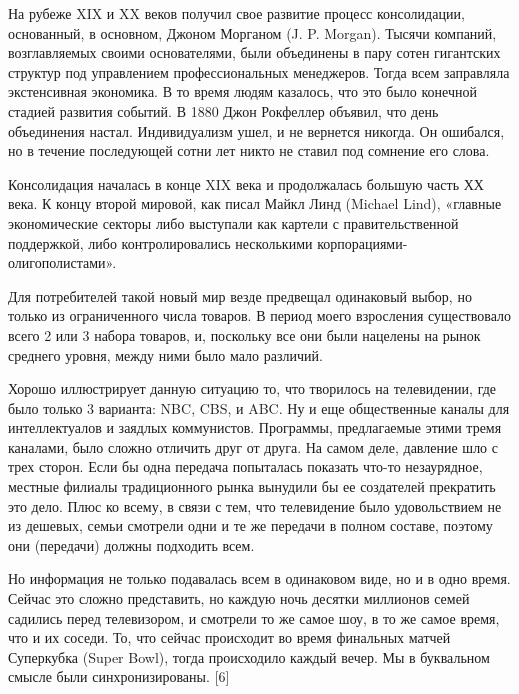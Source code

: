 \documentclass[ebook,12pt,oneside,openany]{memoir}
\begin{document}
На рубеже XIX и XX веков получил свое развитие процесс консолидации,
основанный, в основном, Джоном Морганом (J. P. Morgan). Тысячи
компаний, возглавляемых своими основателями, были объединены в пару
сотен гигантских структур под управлением профессиональных менеджеров.
Тогда всем заправляла экстенсивная экономика. В то время людям
казалось, что это было конечной стадией развития событий. В 1880 Джон
Рокфеллер объявил, что день объединения настал. Индивидуализм ушел, и
не вернется никогда. Он ошибался, но в течение последующей сотни лет
никто не ставил под сомнение его слова. \newline

Консолидация началась в конце XIX века и продолжалась большую часть ХХ
века. К концу второй мировой, как писал Майкл Линд (Michael Lind),
«главные экономические секторы либо выступали как картели с
правительственной поддержкой, либо контролировались несколькими
корпорациями-олигополистами». \newline

Для потребителей такой новый мир везде предвещал одинаковый выбор, но
только из ограниченного числа товаров. В период моего взросления
существовало всего 2 или 3 набора товаров, и, поскольку все они были
нацелены на рынок среднего уровня, между ними было мало различий. \newline

Хорошо иллюстрирует данную ситуацию то, что творилось на телевидении,
где было только 3 варианта: NBC, CBS, и ABC. Ну и еще общественные
каналы для интеллектуалов и заядлых коммунистов. Программы,
предлагаемые этими тремя каналами, было сложно отличить друг от друга.
На самом деле, давление шло с трех сторон. Если бы одна передача
попыталась показать что-то незаурядное, местные филиалы традиционного
рынка вынудили бы ее создателей прекратить это дело. Плюс ко всему, в
связи с тем, что телевидение было удовольствием не из дешевых, семьи
смотрели одни и те же передачи в полном составе, поэтому они
(передачи) должны подходить всем. \newline

Но информация не только подавалась всем в одинаковом виде, но и в одно
время. Сейчас это сложно представить, но каждую ночь десятки миллионов
семей садились перед телевизором, и смотрели то же самое шоу, в то же
самое время, что и их соседи. То, что сейчас происходит во время
финальных матчей Суперкубка (Super Bowl), тогда происходило каждый
вечер. Мы в буквальном смысле были синхронизированы. [6] \newline
\end{document}
